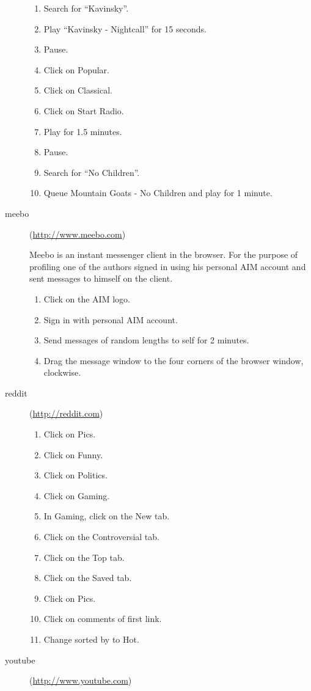 \begin{description}
  \begin{enumerate}
  \item Search for ``Kavinsky''.
  \item Play ``Kavinsky - Nightcall'' for 15 seconds.
  \item Pause.
  \item Click on Popular.
  \item Click on Classical.
  \item Click on Start Radio.
  \item Play for 1.5 minutes.
  \item Pause.
  \item Search for ``No Children''.
  \item Queue Mountain Goats - No Children and play for 1 minute.
  \end{enumerate}
\item[meebo] (\url{http://www.meebo.com})

  Meebo is an instant messenger client in the browser. For the purpose of
  profiling one of the authors signed in using his personal AIM account and
  sent messages to himself on the client.
  \begin{enumerate}
  \item Click on the AIM logo.
  \item Sign in with personal AIM account.
  \item Send messages of random lengths to self for 2 minutes.
  \item Drag the message window to the four corners of the browser window, clockwise.
  \end{enumerate}
\item[reddit] (\url{http://reddit.com})

  \begin{enumerate}
  \item Click on Pics.
  \item Click on Funny.
  \item Click on Politics.
  \item Click on Gaming.
  \item In Gaming, click on the New tab.
  \item Click on the Controversial tab.
  \item Click on the Top tab.
  \item Click on the Saved tab.
  \item Click on Pics.
  \item Click on comments of first link.
  \item Change sorted by to Hot.
  \end{enumerate}
\item[youtube] (\url{http://www.youtube.com})


\end{description}
